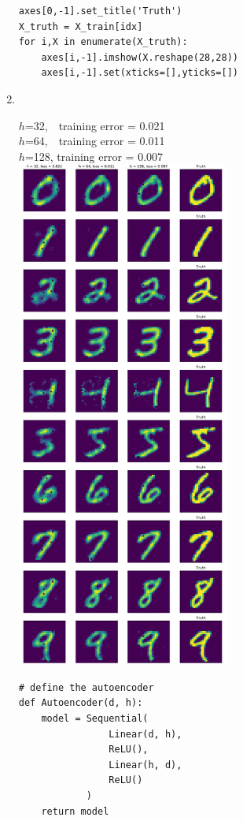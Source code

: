 \documentclass{article}
\begin{document}
\begin{enumerate}
\begin{verbatim}
axes[0,-1].set_title('Truth')
X_truth = X_train[idx]
for i,X in enumerate(X_truth):
    axes[i,-1].imshow(X.reshape(28,28))
    axes[i,-1].set(xticks=[],yticks=[])
        \end{verbatim}
        \newpage

        \item \, \\
        \begin{multicols}{2}
                $h$=32, ~\,training error = 0.021 \\
                $h$=64, ~\,training error = 0.011 \\
                $h$=128, training error = 0.007 \\
                \includegraphics[width=0.55\textwidth]{code/A2b.pdf}
        \end{multicols}
        \begin{verbatim}
# define the autoencoder
def Autoencoder(d, h):
    model = Sequential(
                Linear(d, h),
                ReLU(),
                Linear(h, d),
                ReLU()
            )
    return model


\end{verbatim}
\end{enumerate}
\end{document}
